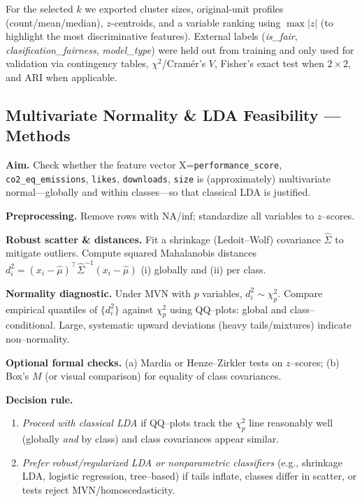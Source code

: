 \documentclass[journal]{IEEEtran}
\begin{document}
For the selected $k$ we exported cluster sizes, original-unit profiles (count/mean/median),
$z$-centroids, and a variable ranking using $\max|z|$ (to highlight the most discriminative features).
External labels (\textit{is\_fair}, \textit{clasification\_fairness}, \textit{model\_type})
were held out from training and only used for validation via contingency tables,
$\chi^2$/Cramér’s $V$, Fisher’s exact test when $2\times 2$, and ARI when applicable.


\subsection{Multivariate Normality \& LDA Feasibility — Methods}
\label{sec:method-lda}

\textbf{Aim.} Check whether the feature vector
X=\texttt{performance\_score}, \texttt{co2\_eq\_emissions}, \texttt{likes}, \texttt{downloads}, \texttt{size}
is (approximately) multivariate normal—globally and within classes—so that classical LDA is justified.

\textbf{Preprocessing.} Remove rows with NA/inf; standardize all variables to $z$–scores.

\textbf{Robust scatter \& distances.} Fit a shrinkage (Ledoit–Wolf) covariance
$\widehat{\Sigma}$ to mitigate outliers. Compute squared Mahalanobis distances
$d_i^2=(x_i-\widehat{\mu})^\top\widehat{\Sigma}^{-1}(x_i-\widehat{\mu})$ (i) globally and
(ii) per class.

\textbf{Normality diagnostic.} Under MVN with $p$ variables, $d_i^2\sim\chi^2_p$.
Compare empirical quantiles of $\{d_i^2\}$ against $\chi^2_p$ using QQ–plots:
global and class–conditional. Large, systematic upward deviations (heavy tails/mixtures) indicate
non–normality.

\textbf{Optional formal checks.} (a) Mardia or Henze–Zirkler tests on $z$–scores; (b) Box’s $M$
(or visual comparison) for equality of class covariances.

\textbf{Decision rule.}
\begin{enumerate}[nosep,leftmargin=*]
	\item \emph{Proceed with classical LDA} if QQ–plots track the $\chi^2_p$ line reasonably well
	(globally \emph{and} by class) and class covariances appear similar.
	\item \emph{Prefer robust/regularized LDA or nonparametric classifiers}
	(e.g., shrinkage LDA, logistic regression, tree–based) if tails inflate, classes differ in
	scatter, or tests reject MVN/homoscedasticity.
\end{enumerate}
\end{document}
